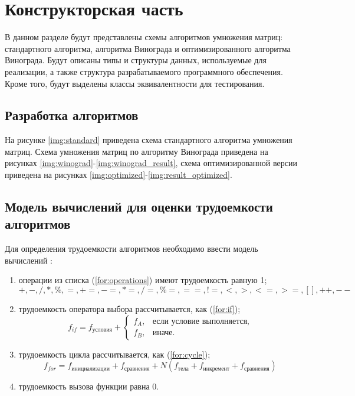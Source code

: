 \chapter{Конструкторская часть}

В данном разделе будут представлены схемы алгоритмов умножения матриц: стандартного алгоритма, алгоритма Винограда и оптимизированного алгоритма Винограда. Будут описаны типы и структуры данных, используемые для реализации, а также структура разрабатываемого программного обеспечения. Кроме того, будут выделены классы эквивалентности для тестирования.

\section{Разработка алгоритмов}

На рисунке \ref{img:standard} приведена схема стандартного алгоритма умножения матриц. 
Схема умножения матриц по алгоритму Винограда приведена на рисунках \ref{img:winograd}-\ref{img:winograd_result}, схема оптимизированной версии приведена на рисунках \ref{img:optimized}-\ref{img:result_optimized}.

\section{Модель вычислений для оценки трудоемкости алгоритмов}

Для определения трудоемкости алгоритмов необходимо ввести модель вычислений \cite{model}:

\begin{enumerate}
	\item операции из списка (\ref{for:operations}) имеют трудоемкость равную 1;
	\begin{equation}
		\label{for:operations}
		+, -, /, *, \%, =, +=, -=, *=, /=, \%=, ==, !=, <, >, <=, >=, [], ++, {-}-
	\end{equation}
	\item трудоемкость оператора выбора  рассчитывается, как (\ref{for:if});
	\begin{equation}
		\label{for:if}
		f_{if} = f_{\text{условия}} +
		\begin{cases}
			f_A, & \text{если условие выполняется,}\\
			f_B, & \text{иначе.}
		\end{cases}
	\end{equation}
	\item трудоемкость цикла рассчитывается, как (\ref{for:cycle});
	\begin{equation}
		\label{for:cycle}
		f_{for} = f_{\text{инициализации}} + f_{\text{сравнения}} + N(f_{\text{тела}} + f_{\text{инкремент}} + f_{\text{сравнения}})
	\end{equation}
	\item трудоемкость вызова функции равна 0.
\end{enumerate}

